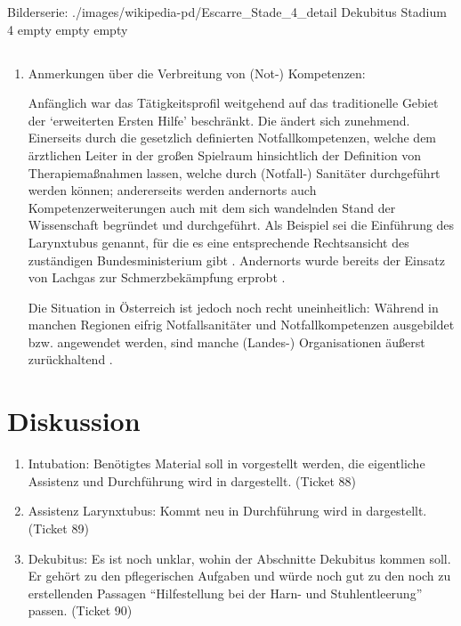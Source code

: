 \documentclass[
ngerman,
paper=a4,
asymmetric,
fontsize=10pt,
headings=small,
draft=false,
numbers=noenddot,
bibtotocnumbered,
footnotes=multiple,
toc=flat,
]{scrreprt}
\newcommand{\Neu}{\fontfamily{lmtt}\fontseries{lc}\selectfont\color{DarkGreen}}
\begin{document}
\begin{enumerate}
{{}
{}
{}
{}
{}
    \begin{PictureSeriesWide}{}{Bilderserie: }
{./images/wikipedia-pd/Escarre_Stade_4_detail}
{Dekubitus Stadium 4 }
{empty}
{}
{empty}
{}
{empty}
{}
\end{PictureSeriesWide}
\clearpage


\nocite{ThiemesPflege12,WundversorgungPflege2}
    }
  \end{enumerate}
\section{\CO{[TAE]}}
  \begin{enumerate}
    \item Anmerkungen über die Verbreitung von (Not-)
    Kompetenzen:
    
    {\Neu Anfänglich war das Tätigkeitsprofil weitgehend auf das
traditionelle Gebiet der \enquote*{erweiterten Ersten Hilfe}
beschränkt. Die ändert sich zunehmend. Einerseits durch die
gesetzlich definierten Notfallkompetenzen, welche dem
ärztlichen Leiter in der großen Spielraum hinsichtlich der
Definition von Therapiemaßnahmen lassen, welche durch
(Notfall-) Sanitäter durchgeführt werden können;
andererseits werden andernorts auch Kompetenzerweiterungen
auch mit dem sich wandelnden Stand der Wissenschaft
begründet und durchgeführt. Als Beispiel sei die Einführung
des Larynxtubus genannt, für die es eine entsprechende
Rechtsansicht des zuständigen Bundesministerium gibt
\cite{BMG-92250_0080-II_A_2010_2010-12-15}. Andernorts wurde
bereits der Einsatz von Lachgas zur Schmerzbekämpfung
erprobt \cite{Hansak201207,Koppensteiner201208}.

Die Situation in Österreich ist jedoch noch recht
uneinheitlich: Während in manchen Regionen eifrig
Notfallsanitäter und Notfallkompetenzen ausgebildet bzw.
angewendet werden, sind manche (Landes-) Organisationen
äußerst zurückhaltend
\cite{Enne2012}.
    }
  
  
  
\end{enumerate}

\chapter{Diskussion}
\begin{enumerate}
  \item Intubation: Benötigtes Material soll in 
  vorgestellt werden, die eigentliche Assistenz und
  Durchführung wird in  dargestellt. (Ticket 88)
  \item Assistenz Larynxtubus: Kommt neu in  
  Durchführung wird in  dargestellt. (Ticket 89)
    \item Dekubitus: Es ist noch unklar, wohin der
    Abschnitte Dekubitus kommen soll. Er gehört zu den pflegerischen Aufgaben und
    würde noch gut zu den noch zu erstellenden Passagen
    \enquote{Hilfestellung bei der Harn- und
    Stuhlentleerung} passen. (Ticket 90)
\end{enumerate}






\printindex
\end{document}
